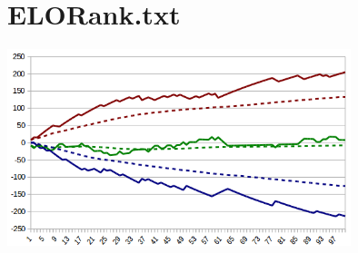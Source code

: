 \section{ELORank.txt}

\begin{scriptsize}
\begin{ttfamily}

\end{ttfamily}
\end{scriptsize}

\begin{center}
\includegraphics[width=10cm]{elorank.png}
\end{center} 
